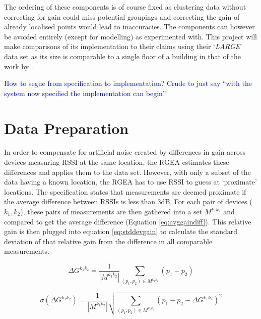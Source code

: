 \documentclass{UoYCSproject}
\begin{document}
            The ordering of these components is of course fixed as clustering data without correcting for gain could miss potential groupings and correcting the gain of already localised points would lead to inaccuracies. The components can however be avoided entirely (except for modelling) as \citeauthor{chintalapudi2010indoor} experimented with. This project will make comparisons of its implementation to their claims using their `\emph{LARGE}' data set as its size is comparable to a single floor of a building in that of the work by \citet{torres2014ujiindoorloc}.
            
            \textcolor{blue}{How to segue from specification to implementation? Crude to just say ``with the system now specified the implementation can begin''}
		
		\section{Data Preparation}
        \label{sec:dataprep}
        
            In order to compensate for artificial noise created by differences in gain across devices measuring RSSI at the same location, the RGEA estimates these differences and applies them to the data set. However, with only a subset of the data having a known location, the RGEA has to use RSSI to guess at `proximate' locations. The specification states that measurements are deemed proximate if the average difference between RSSIs is less than 3dB. For each pair of devices ($k_1,k_2$), these pairs of measurements are then gathered into a set $M^{k_1k_2}$ and compared to get the average difference (Equation \ref{eq:avggaindiff}). This relative gain is then plugged into equation \ref{eq:stddevgain} to calculate the standard deviation of that relative gain from the difference in all comparable measurements.
            
            \begin{equation}
            \label{eq:avggaindiff}
                \Delta G^{k_1k_2}=\dfrac{1}{|M^{k_1k_2}|} \sum_{(p_1,p_2)\in M^{k_1k_2}} (p_1 - p_2)
            \end{equation}
            
            \begin{equation}
            \label{eq:stddevgain}
                \sigma(\Delta G^{k_1k_2})=\dfrac{1}{|M^{k_1k_2}|} \sqrt{\sum_{(p_1,p_2)\in M^{k_1k_2}} (p_1 - p_2 - \Delta G^{k_1k_2})^2}
            \end{equation}
            
\end{document}
